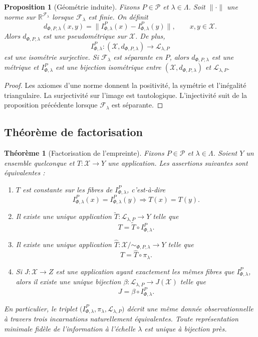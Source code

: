 \documentclass[11pt,a4paper]{article}
\newtheorem{proposition}{Proposition}
\newtheorem{theorem}{Théorème}
\begin{document}
\begin{proposition}[Géométrie induite]
Fixons \(P\in\mathcal P\) et \(\lambda\in\Lambda\). Soit \(\|\cdot\|\) une norme sur \(\mathbb R^{\mathcal F_\lambda}\) lorsque \(\mathcal F_\lambda\) est finie. On définit
\[
d_{\Phi,P,\lambda}(x,y)=\|I_{\Phi,\lambda}^P(x)-I_{\Phi,\lambda}^P(y)\|,
\qquad x,y\in\mathcal X.
\]
Alors \(d_{\Phi,P,\lambda}\) est une pseudométrique sur \(\mathcal X\). De plus,
\[
I_{\Phi,\lambda}^P:(\mathcal X,d_{\Phi,P,\lambda})\longrightarrow \mathcal L_{\lambda,P}
\]
est une isométrie surjective. Si \(\mathcal F_\lambda\) est séparante en \(P\), alors \(d_{\Phi,P,\lambda}\) est une métrique et \(I_{\Phi,\lambda}^P\) est une bijection isométrique entre \((\mathcal X,d_{\Phi,P,\lambda})\) et \(\mathcal L_{\lambda,P}\).
\end{proposition}

\begin{proof}
Les axiomes d'une norme donnent la positivité, la symétrie et l'inégalité triangulaire. La surjectivité sur l'image est tautologique. L'injectivité suit de la proposition précédente lorsque \(\mathcal F_\lambda\) est séparante.
\end{proof}

\subsection{Théorème de factorisation}

\begin{theorem}[Factorisation de l'empreinte]
Fixons \(P\in\mathcal P\) et \(\lambda\in\Lambda\). Soient \(Y\) un ensemble quelconque et \(T:\mathcal X\to Y\) une application. Les assertions suivantes sont équivalentes :
\begin{enumerate}[label=\textbf{(\arabic*)}]
\item \(T\) est constante sur les fibres de \(I_{\Phi,\lambda}^P\), c'est-à-dire
\[
I_{\Phi,\lambda}^P(x)=I_{\Phi,\lambda}^P(y)\Longrightarrow T(x)=T(y).
\]
\item Il existe une unique application \(\widetilde T:\mathcal L_{\lambda,P}\to Y\) telle que
\[
T=\widetilde T\circ I_{\Phi,\lambda}^P.
\]
\item Il existe une unique application \(\widehat T:\mathcal X/{\sim_{\Phi,P,\lambda}}\to Y\) telle que
\[
T=\widehat T\circ \pi_\lambda.
\]
\item Si \(J:\mathcal X\to Z\) est une application ayant exactement les mêmes fibres que \(I_{\Phi,\lambda}^P\), alors il existe une unique bijection \(\beta:\mathcal L_{\lambda,P}\to J(\mathcal X)\) telle que
\[
J=\beta\circ I_{\Phi,\lambda}^P.
\]
\end{enumerate}

En particulier, le triplet \(\bigl(I_{\Phi,\lambda}^P,\pi_\lambda,\mathcal L_{\lambda,P}\bigr)\) décrit une même donnée observationnelle à travers trois incarnations naturellement équivalentes. Toute représentation minimale fidèle de l'information à l'échelle \(\lambda\) est unique à bijection près.
\end{theorem}
\end{document}

